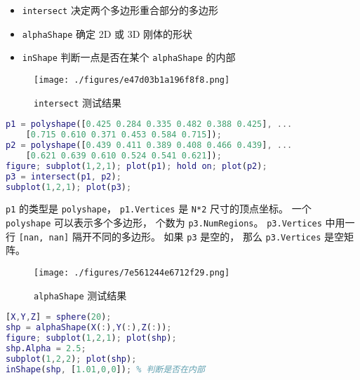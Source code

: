 
\begin{issues}
\issueDraft
\end{issues}

\begin{itemize}
\item \verb|intersect| 决定两个多边形重合部分的多边形
\item \verb|alphaShape| 确定 2D 或 3D 刚体的形状
\item \verb|inShape| 判断一点是否在某个 \verb|alphaShape| 的内部
\end{itemize}

\begin{figure}[ht]
\centering
\texttt{[image: ./figures/e47d03b1a196f8f8.png]}
\caption{\lstinline|intersect| 测试结果} \label{fig_RigBMa_1}
\end{figure}

\begin{lstlisting}[language=matlab]
p1 = polyshape([0.425 0.284 0.335 0.482 0.388 0.425], ...
    [0.715 0.610 0.371 0.453 0.584 0.715]);
p2 = polyshape([0.439 0.411 0.389 0.408 0.466 0.439], ...
    [0.621 0.639 0.610 0.524 0.541 0.621]);
figure; subplot(1,2,1); plot(p1); hold on; plot(p2);
p3 = intersect(p1, p2);
subplot(1,2,1); plot(p3);
\end{lstlisting}
\verb|p1| 的类型是 \verb|polyshape|， \verb|p1.Vertices| 是 \verb|N*2| 尺寸的顶点坐标。 一个 \verb|polyshape| 可以表示多个多边形， 个数为 \verb|p3.NumRegions|。 \verb|p3.Vertices| 中用一行 \verb|[nan, nan]| 隔开不同的多边形。 如果 \verb|p3| 是空的， 那么 \verb|p3.Vertices| 是空矩阵。


\begin{figure}[ht]
\centering
\texttt{[image: ./figures/7e561244e6712f29.png]}
\caption{\lstinline|alphaShape| 测试结果} \label{fig_RigBMa_2}
\end{figure}

\begin{lstlisting}[language=matlab]
[X,Y,Z] = sphere(20);
shp = alphaShape(X(:),Y(:),Z(:));
figure; subplot(1,2,1); plot(shp);
shp.Alpha = 2.5;
subplot(1,2,2); plot(shp);
inShape(shp, [1.01,0,0]); % 判断是否在内部
\end{lstlisting}
